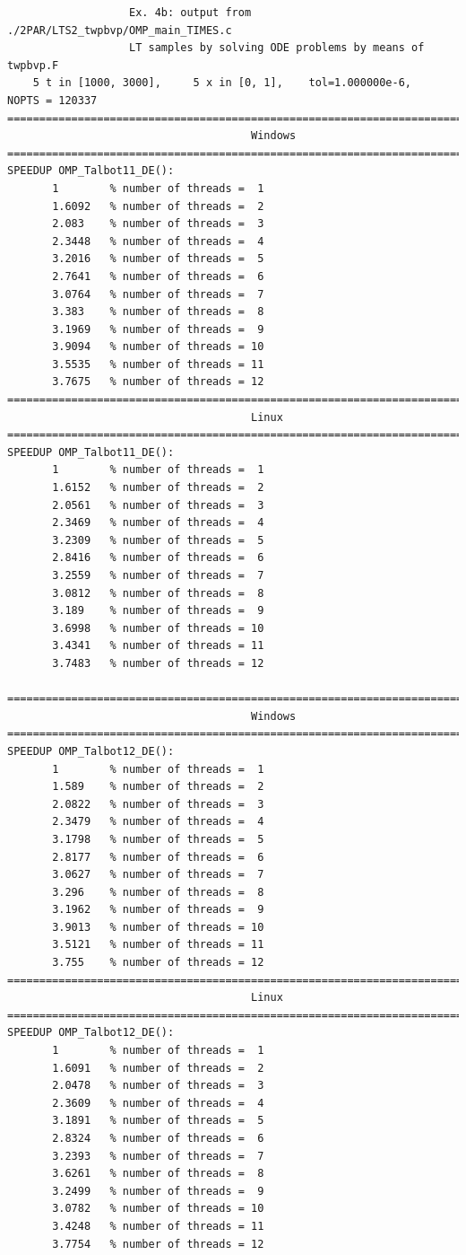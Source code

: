 \documentclass[a4paper,10pt]{report}%
\begin{document}
\begin{lstlisting}
                   Ex. 4b: output from ./2PAR/LTS2_twpbvp/OMP_main_TIMES.c
                   LT samples by solving ODE problems by means of twpbvp.F
    5 t in [1000, 3000],     5 x in [0, 1],    tol=1.000000e-6,    NOPTS = 120337
====================================================================================
                                      Windows
====================================================================================
SPEEDUP OMP_Talbot11_DE():
       1        % number of threads =  1
       1.6092   % number of threads =  2
       2.083    % number of threads =  3
       2.3448   % number of threads =  4
       3.2016   % number of threads =  5
       2.7641   % number of threads =  6
       3.0764   % number of threads =  7
       3.383    % number of threads =  8
       3.1969   % number of threads =  9
       3.9094   % number of threads = 10
       3.5535   % number of threads = 11
       3.7675   % number of threads = 12
====================================================================================
                                      Linux
====================================================================================
SPEEDUP OMP_Talbot11_DE():
       1        % number of threads =  1
       1.6152   % number of threads =  2
       2.0561   % number of threads =  3
       2.3469   % number of threads =  4
       3.2309   % number of threads =  5
       2.8416   % number of threads =  6
       3.2559   % number of threads =  7
       3.0812   % number of threads =  8
       3.189    % number of threads =  9
       3.6998   % number of threads = 10
       3.4341   % number of threads = 11
       3.7483   % number of threads = 12

====================================================================================
                                      Windows
====================================================================================
SPEEDUP OMP_Talbot12_DE():
       1        % number of threads =  1
       1.589    % number of threads =  2
       2.0822   % number of threads =  3
       2.3479   % number of threads =  4
       3.1798   % number of threads =  5
       2.8177   % number of threads =  6
       3.0627   % number of threads =  7
       3.296    % number of threads =  8
       3.1962   % number of threads =  9
       3.9013   % number of threads = 10
       3.5121   % number of threads = 11
       3.755    % number of threads = 12
====================================================================================
                                      Linux
====================================================================================
SPEEDUP OMP_Talbot12_DE():
       1        % number of threads =  1
       1.6091   % number of threads =  2
       2.0478   % number of threads =  3
       2.3609   % number of threads =  4
       3.1891   % number of threads =  5
       2.8324   % number of threads =  6
       3.2393   % number of threads =  7
       3.6261   % number of threads =  8
       3.2499   % number of threads =  9
       3.0782   % number of threads = 10
       3.4248   % number of threads = 11
       3.7754   % number of threads = 12


\end{lstlisting}
\end{document}
